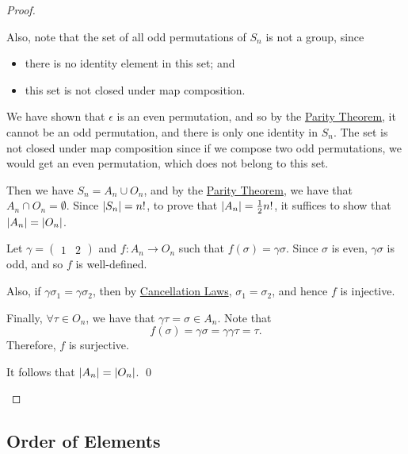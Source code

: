 \begin{proof}
\begin{enumerate}
{        Also, note that the set of all odd permutations of $S_n$ is not a group, since
        \begin{itemize}
          \item there is no identity element in this set; and
          \item this set is not closed under map composition.
        \end{itemize}
    
        We have shown that $\epsilon$ is an even permutation, and so by the \hyperref[thm:parity_theorem]{Parity Theorem}, it cannot be an odd permutation, and there is only one identity in $S_n$. The set is not closed under map composition since if we compose two odd permutations, we would get an even permutation, which does not belong to this set.
    } Then we have $S_n = A_n \cup O_n$, and by the \hyperref[thm:parity_theorem]{Parity Theorem}, we have that $A_n \cap O_n = \emptyset$. Since $\left|S_n\right| = n!$, to prove that $\left|A_n\right| = \frac{1}{2} n!$, it suffices to show that $\left|A_n\right| = \left|O_n\right|$.
    
    Let $\gamma = \begin{pmatrix} 1 & 2 \end{pmatrix}$ and $f : A_n \to O_n$ such that $f(\sigma) = \gamma \sigma$. Since $\sigma$ is even, $\gamma \sigma$ is odd, and so $f$ is well-defined.
    
    Also, if $\gamma \sigma_1 = \gamma \sigma_2$, then by \hyperref[propo:cancellation_laws]{Cancellation Laws}, $\sigma_1 = \sigma_2$, and hence $f$ is injective.
    
    Finally, $\forall \tau \in O_n$, we have that $\gamma \tau = \sigma \in A_n$. Note that
  \begin{equation*}
    f(\sigma) = \gamma \sigma = \gamma \gamma \tau = \tau.
  \end{equation*}
  Therefore, $f$ is surjective.

  It follows that $\left|A_n\right| = \left|O_n\right|$. \qed
  \end{enumerate}
\end{proof}


\subsection{Order of Elements}
\label{sub:order_of_elements}

